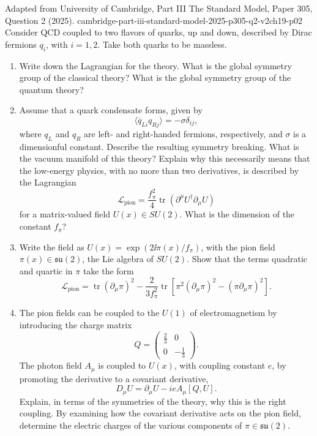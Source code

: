 \begin{enumerate}
  {Adapted from University of Cambridge, Part III The Standard Model,
  Paper 305, Question 2 (2025).}
  {cambridge-part-iii-standard-model-2025-p305-q2-v2ch19-p02}
  Consider QCD coupled to two flavors of quarks, up and down, described by
  Dirac fermions \(q_i\), with \(i=1,2\). Take both quarks to be massless.
  \begin{enumerate}
    \item[(i)]
    Write down the Lagrangian for the theory. What is the global symmetry
    group of the classical theory? What is the global symmetry group of the
    quantum theory?
    \item[(ii)]
    Assume that a quark condensate forms, given by
    \[
      \langle\overline q_{L i}q_{R j}\rangle=-\sigma\delta_{ij},
    \]
    where \(q_L\) and \(q_R\) are left- and right-handed fermions,
    respectively, and \(\sigma\) is a dimensionful constant. Describe the
    resulting symmetry breaking. What is the vacuum manifold of this theory?
    Explain why this necessarily means that the low-energy physics, with no
    more than two derivatives, is described by the Lagrangian
    \[
      \mathcal L_{\mathrm{pion}}
        =\frac{f_\pi^2}{4}
          \operatorname{tr}(\partial^\mu U^\dagger\partial_\mu U)
    \]
    for a matrix-valued field \(U(x)\in SU(2)\). What is the dimension of the
    constant \(f_\pi\)?
    \item[(iii)]
    Write the field as
    \(U(x)=\exp(2\ii\pi(x)/f_\pi)\), with the pion field
    \(\pi(x)\in\mathfrak{su}(2)\), the Lie algebra of \(SU(2)\). Show that
    the terms quadratic and quartic in \(\pi\) take the form
    \[
      \mathcal L_{\mathrm{pion}}
        =\operatorname{tr}(\partial_\mu\pi)^2
        -\frac{2}{3f_\pi^2}
          \operatorname{tr}\!\left[
            \pi^2(\partial_\mu\pi)^2-(\pi\partial_\mu\pi)^2
          \right].
    \]
    \item[(iv)]
    The pion fields can be coupled to the \(U(1)\) of electromagnetism by
    introducing the charge matrix
    \[
      Q=\begin{pmatrix}\frac23&0\\[2pt]0&-\frac13\end{pmatrix}.
    \]
    The photon field \(A_\mu\) is coupled to \(U(x)\), with coupling constant
    \(e\), by promoting the derivative to a covariant derivative,
    \[
      D_\mu U=\partial_\mu U-ieA_\mu[Q,U].
    \]
    Explain, in terms of the symmetries of the theory, why this is the right
    coupling. By examining how the covariant derivative acts on the pion
    field, determine the electric charges of the various components of
    \(\pi\in\mathfrak{su}(2)\).
  \end{enumerate}


\end{enumerate}
